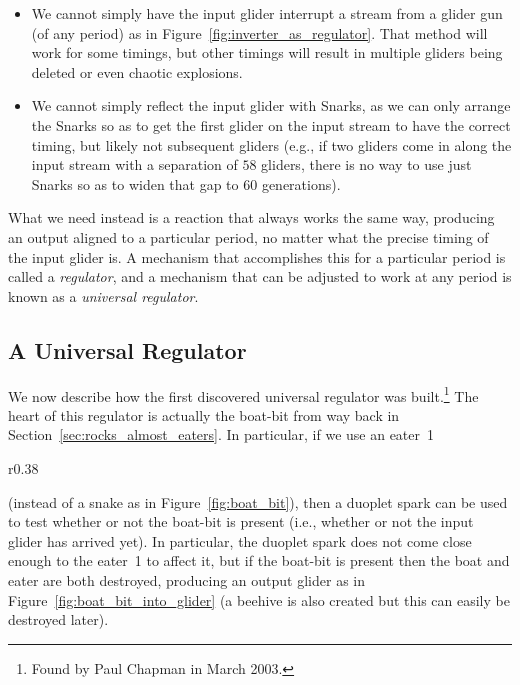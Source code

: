 \begin{itemize}
	\item We cannot simply have the input glider interrupt a stream from a glider gun (of any period) as in Figure~\ref{fig:inverter_as_regulator}. That method will work for some timings, but other timings will result in multiple gliders being deleted or even chaotic explosions.\smallskip
	
	\item We cannot simply reflect the input glider with Snarks, as we can only arrange the Snarks so as to get the first glider on the input stream to have the correct timing, but likely not subsequent gliders (e.g., if two gliders come in along the input stream with a separation of $58$ gliders, there is no way to use just Snarks so as to widen that gap to $60$ generations).\smallskip
\end{itemize}

What we need instead is a reaction that always works the same way, producing an output aligned to a particular period, no matter what the precise timing of the input glider is. A mechanism that accomplishes this for a particular period is called a \emph{regulator}, and a mechanism that can be adjusted to work at any period is known as a \emph{universal regulator}.


\subsection{A Universal Regulator}\label{sec:chapman_universal_regulator}

We now describe how the first discovered universal regulator was built.\footnote{Found by Paul Chapman in March 2003.} The heart of this regulator is actually the boat-bit from way back in Section~\ref{sec:rocks_almost_eaters}. In particular, if we use an eater~1
\begin{wrapfigure}{r}{0.38\textwidth}
	\centering
	\caption{A duoplet spark turning a boat-bit into a glider and beehive. If the boat is not present, nothing happens.}\label{fig:boat_bit_into_glider}
\end{wrapfigure}
(instead of a snake as in Figure~\ref{fig:boat_bit}), then a duoplet spark can be used to test whether or not the boat-bit is present (i.e., whether or not the input glider has arrived yet). In particular, the duoplet spark does not come close enough to the eater~1 to affect it, but if the boat-bit is present then the boat and eater are both destroyed, producing an output glider as in Figure~\ref{fig:boat_bit_into_glider} (a beehive is also created but this can easily be destroyed later).

